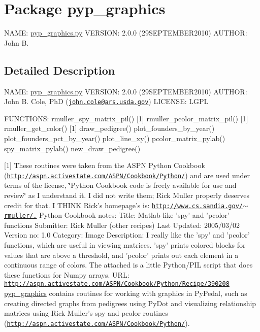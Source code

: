 \hypertarget{namespacepyp__graphics}{
\section{Package pyp\_\-graphics}
\label{namespacepyp__graphics}
}


NAME: \hyperlink{pyp__graphics_8py_source}{pyp\_\-graphics.py} VERSION: 2.0.0 (29SEPTEMBER2010) AUTHOR: John B.  




\subsection{Detailed Description}
NAME: \hyperlink{pyp__graphics_8py_source}{pyp\_\-graphics.py} VERSION: 2.0.0 (29SEPTEMBER2010) AUTHOR: John B. Cole, PhD (\href{mailto:john.cole@ars.usda.gov}{\tt john.cole@ars.usda.gov}) LICENSE: LGPL

FUNCTIONS: rmuller\_\-spy\_\-matrix\_\-pil() \mbox{[}1\mbox{]} rmuller\_\-pcolor\_\-matrix\_\-pil() \mbox{[}1\mbox{]} rmuller\_\-get\_\-color() \mbox{[}1\mbox{]} draw\_\-pedigree() plot\_\-founders\_\-by\_\-year() plot\_\-founders\_\-pct\_\-by\_\-year() plot\_\-line\_\-xy() pcolor\_\-matrix\_\-pylab() spy\_\-matrix\_\-pylab() new\_\-draw\_\-pedigree()

\mbox{[}1\mbox{]} These routines were taken from the ASPN Python Cookbook (\href{http://aspn.activestate.com/ASPN/Cookbook/Python/}{\tt http://aspn.activestate.com/ASPN/Cookbook/Python/}) and are used under terms of the license, \char`\"{}Python Cookbook code is freely available for use
     and review\char`\"{} as I understand it. I did not write them; Rick Muller properly deserves credit for that. I THINK Rick's homepage's is: \href{http://www.cs.sandia.gov/~rmuller/.}{\tt http://www.cs.sandia.gov/$\sim$rmuller/.} Python Cookbook notes: Title: Matlab-\/like 'spy' and 'pcolor' functions Submitter: Rick Muller (other recipes) Last Updated: 2005/03/02 Version no: 1.0 Category: Image Description: I really like the 'spy' and 'pcolor' functions, which are useful in viewing matrices. 'spy' prints colored blocks for values that are above a threshold, and 'pcolor' prints out each element in a continuous range of colors. The attached is a little Python/PIL script that does these functions for Numpy arrays. URL: \href{http://aspn.activestate.com/ASPN/Cookbook/Python/Recipe/390208}{\tt http://aspn.activestate.com/ASPN/Cookbook/Python/Recipe/390208} \hyperlink{namespacepyp__graphics}{pyp\_\-graphics} contains routines for working with graphics in PyPedal, such as creating directed graphs from pedigrees using PyDot and visualizing relationship matrices using Rick Muller's spy and pcolor routines (\href{http://aspn.activestate.com/ASPN/Cookbook/Python/}{\tt http://aspn.activestate.com/ASPN/Cookbook/Python/}).

